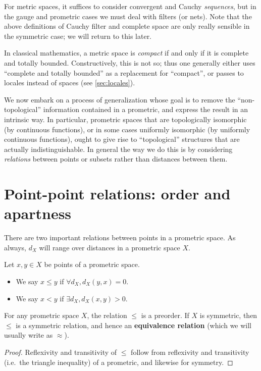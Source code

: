 \documentclass{article}
\begin{document}
For metric spaces, it suffices to consider convergent and Cauchy \emph{sequences}, but in the gauge and prometric cases we must deal with filters (or nets).
Note that the above definitions of Cauchy filter and complete space are only really sensible in the symmetric case; we will return to this later.

In classical mathematics, a metric space is \emph{compact} if and only if it is complete and totally bounded.
Constructively, this is not so; thus one generally either uses ``complete and totally bounded'' as a replacement for ``compact'', or passes to locales instead of spaces (see \cref{sec:locales}).


We now embark on a process of generalization whose goal is to remove the ``non-topological'' information contained in a prometric, and express the result in an intrinsic way.
In particular, prometric spaces that are topologically isomorphic (by continuous functions), or in some cases uniformly isomorphic (by uniformly continuous functions), ought to give rise to ``topological'' structures that are actually indistinguishable.
In general the way we do this is by considering \emph{relations} between points or subsets rather than distances between them.


\section{Point-point relations: order and apartness}
\label{sec:point-point}
\label{sec:order}

There are two important relations between points in a prometric space.
As always, $d_X$ will range over distances in a prometric space $X$.

\begin{defn}
  Let $x,y\in X$ be points of a prometric space.
  \begin{itemize}
  \item We say $x\le y$ if $\forall d_X, d_X(y,x)=0$.
  \item We say $x<y$ if $\exists d_X, d_X(x,y)>0$.
  \end{itemize}
\end{defn}

\begin{thm}
  For any prometric space $X$, the relation $\le$ is a preorder.
  If $X$ is symmetric, then $\le$ is a symmetric relation, and hence an \textbf{equivalence relation} (which we will usually write as $\approx$).
\end{thm}
\begin{proof}
  Reflexivity and transitivity of $\le$ follow from reflexivity and transitivity (i.e.\ the triangle inequality) of a prometric, and likewise for symmetry.
\end{proof}
\end{document}

